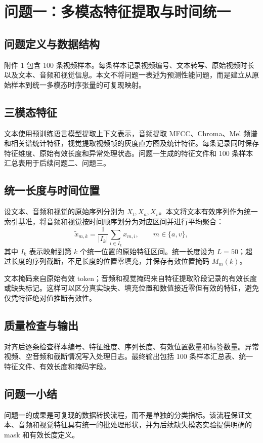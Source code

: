 \section{问题一：多模态特征提取与时间统一}

\subsection{问题定义与数据结构}
附件 1 包含 100 条视频样本。每条样本记录视频编号、文本转写、原始视频时长以及文本、音频和视觉信息。本文不将问题一表述为预测性能问题，而是建立从原始样本到统一多模态时序张量的可复现映射。

\subsection{三模态特征}
文本使用预训练语言模型提取上下文表示，音频提取 MFCC、Chroma、Mel 频谱和相关谱统计特征，视觉提取视频帧的灰度直方图及统计特征。每条记录同时保存特征维度、原始有效长度和异常处理状态。问题一生成的特征文件和 100 条样本汇总表用于后续问题二、问题三。

\subsection{统一长度与时间位置}
设文本、音频和视觉的原始序列分别为 $X_t,X_a,X_v$。本文将文本有效序列作为统一索引基准，将音频和视觉按时间顺序划分为对应区间并进行平均聚合：
\begin{equation}
\widetilde{x}_{m,k}=\frac{1}{|I_k|}\sum_{i\in I_k}x_{m,i},\qquad m\in\{a,v\},
\end{equation}
其中 $I_k$ 表示映射到第 $k$ 个统一位置的原始特征区间。统一长度设为 $L=50$；超过长度的序列截断，不足长度的位置零填充，并保存有效位置掩码 $M_m(k)$。

文本掩码来自原始有效 token；音频和视觉掩码来自特征提取阶段记录的有效长度或缺失标记。这样可以区分真实缺失、填充位置和数值接近零但有效的特征，避免仅凭特征绝对值推断有效性。

\subsection{质量检查与输出}
对齐后逐条检查样本编号、特征维度、序列长度、有效位置数量和标签数量。异常视频、空音频和截断情况写入处理日志。最终输出包括 100 条样本汇总表、统一特征文件、有效长度和掩码字段。

\subsection{问题一小结}
问题一的成果是可复现的数据转换流程，而不是单独的分类指标。该流程保证文本、音频和视觉特征具有统一的批处理形状，并为后续缺失模态实验提供明确的 mask 和有效长度定义。

